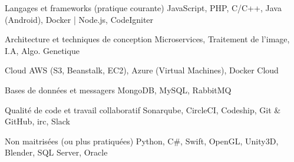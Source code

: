 

\begin{cvskills}

  \cvskill
    {Langages et frameworks (pratique courante)} %
    {JavaScript, PHP, C/C++, Java (Android), Docker | Node.js, CodeIgniter} %

  \cvskill
    {Architecture et techniques de conception} %
    {Microservices, Traitement de l'image, I.A, Algo. Genetique} %

  \cvskill
    {Cloud} %
    {AWS (S3, Beanstalk, EC2), Azure (Virtual Machines), Docker Cloud} %

  \cvskill
    {Bases de données et messagers} %
    {MongoDB, MySQL, RabbitMQ} %

  \cvskill
    {Qualité de code et travail collaboratif} %
    {Sonarqube, CircleCI, Codeship, Git \& GitHub, irc, Slack} %

  \cvskill
    {Non maitrisées (ou plus pratiquées)} %
    {Python, C\#, Swift, OpenGL, Unity3D, Blender, SQL Server, Oracle} %

\end{cvskills}
